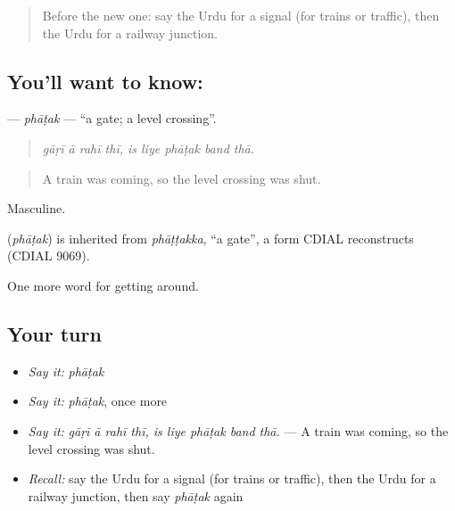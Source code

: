 \begin{quote}
Before the new one: say the Urdu for a signal (for trains or traffic), then the Urdu for a railway junction.
\end{quote}

\subsection*{You'll want to know: }
\textbf{} — \emph{phāṭak} — \textquotedblleft{}a gate; a level crossing\textquotedblright{}.

\begin{quote}
        
\end{quote}

\begin{quote}
\emph{gāṛī ā rahī thī, is liye phāṭak band thā.}
\end{quote}

\begin{quote}
A train was coming, so the level crossing was shut.
\end{quote}

Masculine.

\begin{cousinweb}
\textbf{} (\emph{phāṭak}) is inherited from \emph{phāṭṭakka}, \textquotedblleft{}a gate\textquotedblright{}, a form CDIAL reconstructs (CDIAL 9069).
\end{cousinweb}

\begin{grammarlens}[title={What you've built}]
One more word for getting around.
\end{grammarlens}

\subsection*{Your turn}
\begin{itemize}
\raggedright
  \item \emph{Say it:} \emph{phāṭak}
  \item \emph{Say it:} \emph{phāṭak}, once more
  \item \emph{Say it:} \emph{gāṛī ā rahī thī, is liye phāṭak band thā.} — A train was coming, so the level crossing was shut.
  \item \emph{Recall:} say the Urdu for a signal (for trains or traffic), then the Urdu for a railway junction, then say \emph{phāṭak} again
\end{itemize}

